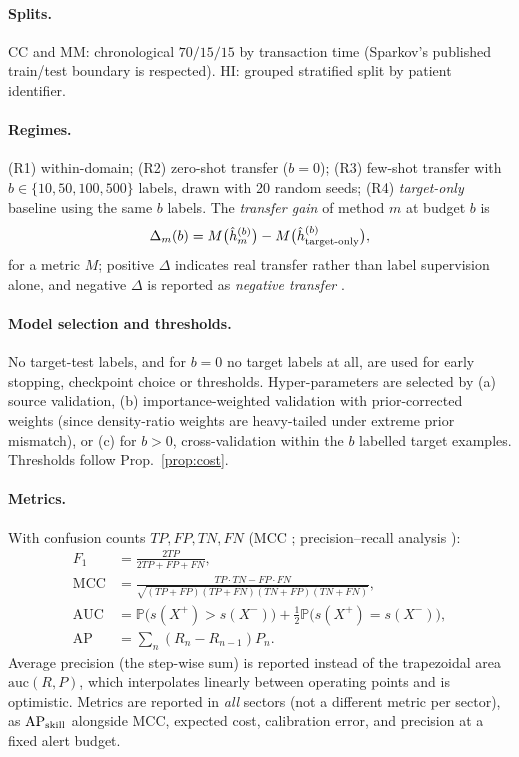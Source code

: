 \documentclass[journal]{IEEEtran}
\newcommand{\Prob}{\mathbb{P}}
\newcommand{\1}{\mathbf{1}}
\begin{document}
\paragraph{Splits.} CC and MM: chronological $70/15/15$ by transaction time (Sparkov's published train/test boundary is respected). HI: grouped stratified split by patient identifier.

\paragraph{Regimes.} (R1) within-domain; (R2) zero-shot transfer ($b=0$); (R3) few-shot transfer with $b\in\{10,50,100,500\}$ labels, drawn with 20 random seeds; (R4) \emph{target-only} baseline using the same $b$ labels. The \emph{transfer gain} of method $m$ at budget $b$ is
\begin{equation}
\Delta_m(b)=M\big(\hat h_m^{(b)}\big)-M\big(\hat h_{\rm target\text{-}only}^{(b)}\big),
\end{equation}
for a metric $M$; positive $\Delta$ indicates real transfer rather than label supervision alone, and negative $\Delta$ is reported as \emph{negative transfer} \cite{wang2019negative}.

\paragraph{Model selection and thresholds.} No target-test labels, and for $b=0$ no target labels at all, are used for early stopping, checkpoint choice or thresholds. Hyper-parameters are selected by (a) source validation, (b) importance-weighted validation \cite{you2019dev} with prior-corrected weights (since density-ratio weights are heavy-tailed under extreme prior mismatch), or (c) for $b>0$, cross-validation within the $b$ labelled target examples. Thresholds follow Prop.~\ref{prop:cost}.

\paragraph{Metrics.} With confusion counts $TP,FP,TN,FN$ (MCC \cite{chicco2020mcc}; precision--recall analysis \cite{saito2015pr}):
\begin{align}
F_1&=\frac{2TP}{2TP+FP+FN},\\
\mathrm{MCC}&=\frac{TP\cdot TN-FP\cdot FN}{\sqrt{(TP{+}FP)(TP{+}FN)(TN{+}FP)(TN{+}FN)}},\\
\mathrm{AUC}&=\Prob\big(s(X^+)>s(X^-)\big)+\tfrac12\Prob\big(s(X^+)=s(X^-)\big),\\
\mathrm{AP}&=\sum_n(R_n-R_{n-1})P_n.
\end{align}
Average precision (the step-wise sum) is reported instead of the trapezoidal area $\mathrm{auc}(R,P)$, which interpolates linearly between operating points and is optimistic. Metrics are reported in \emph{all} sectors (not a different metric per sector), as $\mathrm{AP}_{\rm skill}$ alongside MCC, expected cost, calibration error, and precision at a fixed alert budget.
\end{document}
